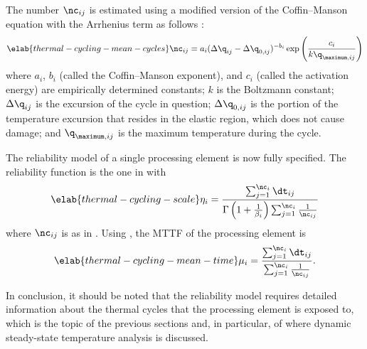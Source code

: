 The number $\nc_{ij}$ is estimated using a modified version of the
Coffin--Manson equation with the Arrhenius term as follows \cite{xiang2010,
jedec2016}:
\begin{equation} \elab{thermal-cycling-mean-cycles}
  \nc_{ij} = a_i (\Delta \q_{ij} - \Delta \q_{0, ij})^{-b_i} \exp\left(\frac{c_i}{k \q_{\maximum, ij}}\right)
\end{equation}
where $a_i$, $b_i$ (called the Coffin--Manson exponent), and $c_i$ (called the
activation energy) are empirically determined constants; $k$ is the Boltzmann
constant; $\Delta \q_{ij}$ is the excursion of the cycle in question; $\Delta
\q_{0, ij}$ is the portion of the temperature excursion that resides in the
elastic region, which does not cause damage; and $\q_{\maximum, ij}$ is the
maximum temperature during the cycle.

The reliability model of a single processing element is now fully specified. The
reliability function is the one in  with
\begin{equation} \elab{thermal-cycling-scale}
  \scale_i = \frac{\sum_{j = 1}^{\nc_i} \dt_{ij}}{\Gamma\left(1 + \frac{1}{\shape_i}\right) \sum_{j = 1}^{\nc_i} \frac{1}{\nc_{ij}}}
\end{equation}
where $\nc_{ij}$ is as in . Using
, the \ac{MTTF} of the processing element is
\begin{equation} \elab{thermal-cycling-mean-time}
  \mean_i = \frac{\sum_{j = 1}^{\nc_i} \dt_{ij}}{\sum_{j = 1}^{\nc_i} \frac{1}{\nc_{ij}}}.
\end{equation}

In conclusion, it should be noted that the reliability model requires detailed
information about the thermal cycles that the processing element is exposed to,
which is the topic of the previous sections and, in particular, of
 where dynamic steady-state temperature analysis is
discussed.
